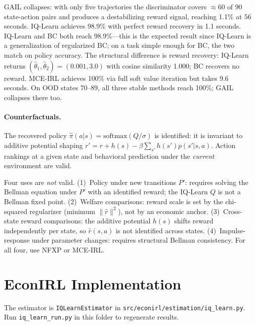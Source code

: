 \documentclass[10pt]{article}
\begin{document}
GAIL collapses: with only five trajectories the discriminator covers ${\approx}60$ of 90 state-action pairs and produces a destabilizing reward signal, reaching 1.1\% at 56 seconds. IQ-Learn achieves 98.9\% with perfect reward recovery in 1.1 seconds. IQ-Learn and BC both reach 98.9\%---this is the expected result since IQ-Learn is a generalization of regularized BC; on a task simple enough for BC, the two match on policy accuracy. The structural difference is reward recovery: IQ-Learn returns $(\hat\theta_1,\hat\theta_2)=(0.001,3.0)$ with cosine similarity 1.000; BC recovers no reward. MCE-IRL achieves 100\% via full soft value iteration but takes 9.6 seconds. On OOD states 70--89, all three stable methods reach 100\%; GAIL collapses there too.

\paragraph{Counterfactuals.}
The recovered policy $\hat{\pi}(a|s) = \mathrm{softmax}(Q/\sigma)$ is identified: it is invariant to additive potential shaping $r' = r + h(s) - \beta\sum_{s'}h(s')p(s'|s,a)$. Action rankings at a given state and behavioral prediction under the \emph{current} environment are valid.

Four uses are \emph{not} valid. (1)~Policy under new transitions $P'$: requires solving the Bellman equation under $P'$ with an identified reward; the IQ-Learn $Q$ is not a Bellman fixed point. (2)~Welfare comparisons: reward scale is set by the chi-squared regularizer (minimum $\|\hat{r}\|^2$), not by an economic anchor. (3)~Cross-state reward comparisons: the additive potential $h(s)$ shifts reward independently per state, so $\hat{r}(s,a)$ is not identified across states. (4)~Impulse-response under parameter changes: requires structural Bellman consistency. For all four, use NFXP or MCE-IRL.


\section{EconIRL Implementation}

The estimator is \texttt{IQLearnEstimator} in \texttt{src/econirl/estimation/iq\_learn.py}. Run \texttt{iq\_learn\_run.py} in this folder to regenerate results.
\end{document}
